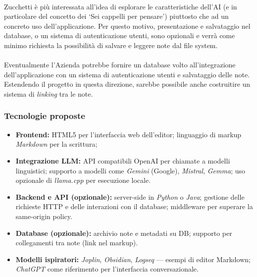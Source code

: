 \documentclass[a4paper,11pt]{article}
\begin{document}
\paragraph{}
Zucchetti è più interessata all'idea di esplorare le caratteristiche dell'AI (e in particolare del concetto dei `Sei cappelli per pensare') piuttosto che ad un concreto uso dell'applicazione. Per questo motivo,
presentazione e salvataggio nel database, o un sistema di autenticazione utenti, sono opzionali e verrà come minimo richiesta la possibilità di salvare e leggere note dal file system.
\paragraph{}
Eventualmente l'Azienda potrebbe fornire un database volto all'integrazione dell'applicazione con un sistema di autenticazione utenti e salvataggio delle note. 
Estendendo il progetto in questa direzione, sarebbe possibile anche costruitire un sistema di \textit{linking} tra le note.
\subsubsection{Tecnologie proposte}
\begin{itemize}[noitemsep, topsep=0pt]
  \item \textbf{Frontend:} HTML5 per l'interfaccia web dell'editor; linguaggio di markup \textit{Markdown} per la scrittura;
  \item \textbf{Integrazione LLM:} API compatibili OpenAI per chiamate a modelli linguistici; supporto a modelli come \textit{Gemini} (Google), \textit{Mistral}, \textit{Gemma}; uso opzionale di \textit{llama.cpp} per esecuzione locale.
  \item \textbf{Backend e API (opzionale):} server-side in \textit{Python} o \textit{Java}; gestione delle richieste HTTP e delle interazioni con il database; middleware per superare la same-origin policy.
  \item \textbf{Database (opzionale):} archivio note e metadati su DB; supporto per collegamenti tra note (link nel markup).
  \item \textbf{Modelli ispiratori:} \textit{Joplin}, \textit{Obsidian}, \textit{Logseq} — esempi di editor Markdown; \textit{ChatGPT} come riferimento per l'interfaccia conversazionale.
\end{itemize}
\end{document}
